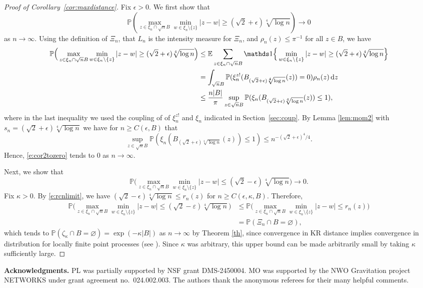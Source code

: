\documentclass{amsart}
\theoremstyle{plain}
\theoremstyle{definition}
\theoremstyle{remark}
\def\P{\mathbb P}
\def\one{\mathds1}
\def\d{\mathrm d}
\begin{document}
\begin{proof}[Proof of Corollary~\ref{cor:maxdistance}]
Fix $\epsilon >0$. We first show that \[\P\left(\max\limits_{z \in \xi_n \cap \sqrt nB} \min\limits_{w \in \xi_n\setminus \{z\}} |z-w| \ge (\sqrt{2}+\epsilon)\sqrt[4]{\log n}\right) \to 0\] as $n \to \infty$. Using the definition of $\Xi_{n}$, that $L_n$ is the intensity measure for $\Xi_{n}$, and $\rho_n(z) \le \pi^{-1}$ for all $z \in B$, we have
\begin{align}
\P\Big(\max_{z \in \xi_n \cap \sqrt nB}  \min\limits_{w \in \xi_n\setminus \{z\}} |z-w| \ge (\sqrt{2}+\epsilon)\sqrt[4]{\log n}\Big) &\le \mathbb E \sum_{z \in \xi_n \cap \sqrt nB} \one\Big\{ \min\limits_{w \in \xi_n\setminus \{z\}} |z-w| \ge (\sqrt{2}+\epsilon)  \sqrt[4]{\log n} \Big\} \notag \\
&= \int_{\sqrt n B} \P(\xi_n^{z!}(B_{(\sqrt{2}+\epsilon)\sqrt[4]{ \log n}}(z))=0) \rho_n(z)\,  \d z\notag \\
&\le  
\frac{n |B|}{\pi} \sup_{z \in \sqrt n B} \P(\xi_n(B_{(\sqrt{2}+\epsilon)\sqrt[4]{ \log n}}(z))\le 1),\label{e:cor2tozero}
\end{align}
where in the last inequality we used the coupling of of $\xi_n^{z!}$ and $\xi_n$ indicated in Section~\ref{sec:coup}.
By Lemma \ref{lem:mom2} with $s_n = (\sqrt{2}+\epsilon)\sqrt[4]{\log n}$ we have  for $n \ge C(\epsilon, B)$ that 
\[
\sup_{z \in \sqrt n B} \P(\xi_n(B_{(\sqrt{2}+\epsilon)\sqrt[4]{\log n}}(z))\le 1) \le n^{-(\sqrt{2}+\epsilon)^4 /4 }.\] Hence, \eqref{e:cor2tozero} tends to $0$ as $n \to \infty$.

Next, we show that \[\P\Big(\max\limits_{z \in \xi_n \cap \sqrt nB}  \min\limits_{w \in \xi_n\setminus \{z\}} |z-w| \le (\sqrt{2}-\epsilon) \sqrt[4]{\log n}\Big) \to 0.\]
 Fix $\kappa>0$. By \eqref{e:rcnlimit}, we have $(\sqrt{2}-\epsilon)  \sqrt[4]{\log n} \le r_{n}(z)$ for $n\ge C(\epsilon, \kappa, B)$.  
  Therefore,
\begin{align*}
	\P\Big(\max_{z \in \xi_n \cap \sqrt nB} \min_{w \in \xi_n\setminus \{z\}} |z-w| \le (\sqrt{2}-\varepsilon) \sqrt[4]{\log n} \Big) &\le \P\Big(\max_{z \in \xi_n \cap \sqrt nB} \min_{w \in \xi_n\setminus \{z\}} |z-w| \le  r_{n}(z) \Big)\\
	&=\P(\Xi_{n} \cap B =\varnothing),
\end{align*}
which tends to $\P(\zeta_{\kappa} \cap B= \varnothing) = \exp(-\kappa |B|)$ as $n \to \infty$ by Theorem \ref{th}, since convergence in KR distance implies convergence in distribution for locally finite point processes (see \cite[Proposition 2.1]{DST16}). 
Since $\kappa$ was arbitrary, this upper bound can be made arbitrarily small by taking $\kappa$ sufficiently large. 
\end{proof}
\noindent
{\bf Acknowledgments.} 
PL was partially supported by NSF grant DMS-2450004.
MO was supported by the NWO Gravitation project NETWORKS under grant agreement no.~024.002.003. The authors thank the anonymous referees for their many helpful comments.




\end{document}
